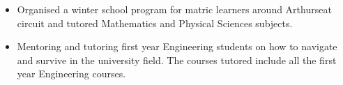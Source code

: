 \documentclass[10pt,a4paper,ragged2e]{altacv}
\begin{document}
\begin{itemize}
%

\item Organised a winter school program for matric learners around Arthurseat circuit and tutored Mathematics and Physical Sciences subjects.

\end{itemize}



\begin{itemize}

\item Mentoring and tutoring first year Engineering students on how to navigate and survive in the university field. The courses tutored include all the first year Engineering courses.

\end{itemize}





\end{document}
